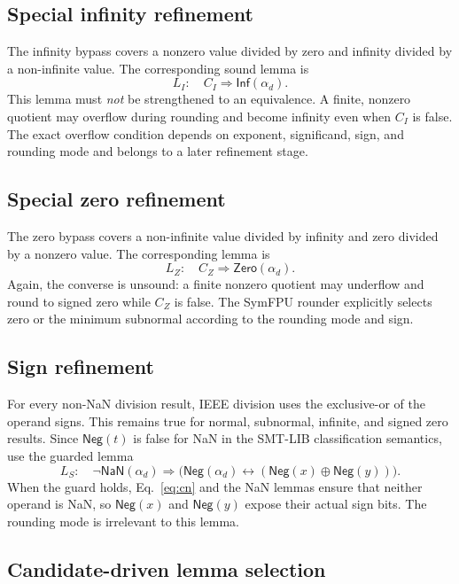 \documentclass[runningheads]{llncs}
\newcommand{\isnan}{\mathsf{NaN}}
\newcommand{\isinf}{\mathsf{Inf}}
\newcommand{\iszero}{\mathsf{Zero}}
\newcommand{\signbit}{\mathsf{Neg}}
\newcommand{\proxy}{\alpha_d}
\begin{document}
\subsection{Special infinity refinement}

The infinity bypass covers a nonzero value divided by zero and infinity
divided by a non-infinite value.  The corresponding sound lemma is
\[
  L_I:\quad C_I \Longrightarrow \isinf(\proxy).
  \tag{INF-SPECIAL}
\]
This lemma must \emph{not} be strengthened to an equivalence.  A finite,
nonzero quotient may overflow during rounding and become infinity even when
\(C_I\) is false.  The exact overflow condition depends on exponent,
significand, sign, and rounding mode and belongs to a later refinement stage.

\subsection{Special zero refinement}

The zero bypass covers a non-infinite value divided by infinity and zero
divided by a nonzero value.  The corresponding lemma is
\[
  L_Z:\quad C_Z \Longrightarrow \iszero(\proxy).
  \tag{ZERO-SPECIAL}
\]
Again, the converse is unsound: a finite nonzero quotient may underflow and
round to signed zero while \(C_Z\) is false.  The SymFPU rounder explicitly
selects zero or the minimum subnormal according to the rounding mode and sign.

\subsection{Sign refinement}

For every non-NaN division result, IEEE division uses the exclusive-or of the
operand signs.  This remains true for normal, subnormal, infinite, and signed
zero results.  Since \(\signbit(t)\) is false for NaN in the SMT-LIB
classification semantics, use the guarded lemma
\[
  L_S:\quad
  \neg\isnan(\proxy) \Longrightarrow
  \bigl(\signbit(\proxy)
  \leftrightarrow
  (\signbit(x)\oplus\signbit(y))\bigr).
  \tag{SIGN}
\]
When the guard holds, Eq.~\eqref{eq:cn} and the NaN lemmas ensure that neither
operand is NaN, so \(\signbit(x)\) and \(\signbit(y)\) expose their actual sign
bits.  The rounding mode is irrelevant to this lemma.

\subsection{Candidate-driven lemma selection}
\end{document}
